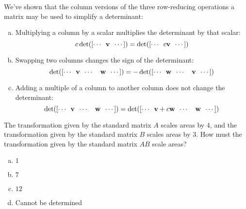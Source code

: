\begin{applicationActivities}{1}{25}
\begin{fact}
  We've shown that the column versions of the three row-reducing operations
  a matrix may be used to simplify a determinant:
  \begin{enumerate}[(a)]
  \item Multiplying a column by a scalar multiplies the
        determinant by that scalar:
        \[c\det([\cdots\hspace{0.5em}\vec{v}\hspace{0.5em} \cdots])=
        \det([\cdots\hspace{0.5em}c\vec{v}\hspace{0.5em} \cdots])\]
  \item Swapping two columns changes the sign of the determinant:
        \[\det([\cdots\hspace{0.5em}\vec{v}\hspace{0.5em}
        \cdots\hspace{1em}\vec{w}\hspace{0.5em} \cdots])=
        -\det([\cdots\hspace{0.5em}\vec{w}\hspace{0.5em}
        \cdots\hspace{1em}\vec{v}\hspace{0.5em} \cdots])\]
  \item Adding a multiple of a column to another column does not
        change the determinant:
        \[\det([\cdots\hspace{0.5em}\vec{v}\hspace{0.5em}
        \cdots\hspace{1em}\vec{w}\hspace{0.5em} \cdots])=
        \det([\cdots\hspace{0.5em}\vec{v}+c\vec{w}\hspace{0.5em}
        \cdots\hspace{1em}\vec{w}\hspace{0.5em} \cdots])\]
  \end{enumerate}
\end{fact}

\begin{activity}{5}
  The transformation given by the standard matrix \(A\) scales areas by
  \(4\), and the transformation given by the standard matrix \(B\) scales
  areas by \(3\). How must the transformation given by the standard matrix
  \(AB\) scale areas?
  \begin{enumerate}[(a)]
  \item \(1\)
  \item \(7\)
  \item \(12\)
  \item Cannot be determined
  \end{enumerate}


\end{activity}
\end{applicationActivities}

